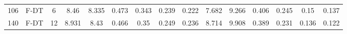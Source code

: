 \begin{table}
\begin{tabular}{@{\hskip3pt}c@{\hskip3pt}c@{\hskip3pt}c@{\hskip3pt}c@{\hskip3pt}c@{\hskip3pt}c@{\hskip3pt}c@{\hskip3pt}c@{\hskip3pt}c@{\hskip3pt}c@{\hskip3pt}c@{\hskip3pt}c@{\hskip3pt}c@{\hskip3pt}c@{\hskip3pt}c}
        106 &           F-DT &                   6 &              8.46 &           8.335 &           0.473 &           0.343 &           0.239 &           0.222 &               7.682 &           9.266 &           0.406 &          0.245 &            0.15 &           0.137 \\
        140 &           F-DT &                  12 &             8.931 &            8.43 &           0.466 &            0.35 &           0.249 &           0.236 &               8.714 &           9.908 &           0.389 &          0.231 &           0.136 &           0.122 \\
\bottomrule
\end{tabular}
\end{table}
